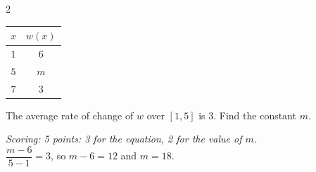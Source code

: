 \begin{multicols}{2}
\noindent\begin{minipage}{\linewidth}
\begin{exo}{}
\begin{center}\begin{tabular}{|c|c|}\hline$x$&$w(x)$\\\hline$1$&$6$\\\hline$5$&$m$\\\hline$7$&$3$\\\hline\end{tabular}\end{center}
The average rate of change of $w$ over $[1,5]$ is $3$. Find the constant $m$.
\ifkey\else\vspace{1.4cm}\fi
\begin{solution}
\textit{Scoring: 5 points: 3 for the equation, 2 for the value of $m$.}\\
$\dfrac{m-6}{5-1}=3$, so $m-6=12$ and $m=18$.
\end{solution}
\end{exo}
\end{minipage}\par\vspace{8pt}

\end{multicols}

